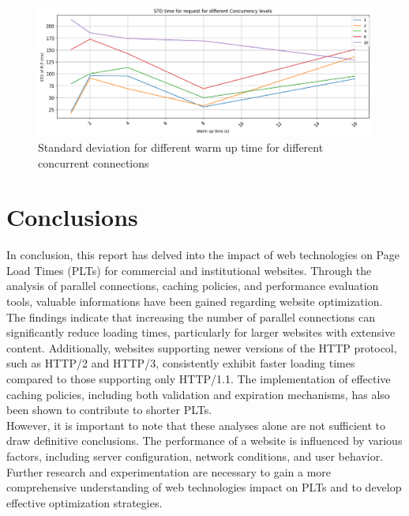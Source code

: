 \documentclass[eng]{class}
\begin{document}
\begin{figure}[H]
  \centering
  \includegraphics[width=\columnwidth]{images/var_warm_up.png}
  \caption{Standard deviation for different warm up time for different concurrent connections}
  \label{fig-8}
\end{figure}

\section{Conclusions}
In conclusion, this report has delved into the impact of web
technologies on Page Load Times (PLTs) for commercial and
institutional websites. Through the analysis of parallel connections, caching policies, and performance evaluation tools,
valuable informations have been gained regarding website
optimization.\\
The findings indicate that increasing the number of parallel
connections can significantly reduce loading times, particularly for larger websites with extensive content.
Additionally, websites supporting newer versions of the HTTP protocol, such as HTTP/2 and HTTP/3, consistently exhibit faster
loading times compared to those supporting only HTTP/1.1.
The implementation of effective caching policies, including
both validation and expiration mechanisms, has also been
shown to contribute to shorter PLTs.\\
However, it is important to note that these analyses alone
are not sufficient to draw definitive conclusions. The performance of a website is influenced by various factors, including
server configuration, network conditions, and user behavior.
Further research and experimentation are necessary to gain
a more comprehensive understanding of web technologies
impact on PLTs and to develop effective optimization strategies.
\end{document}
